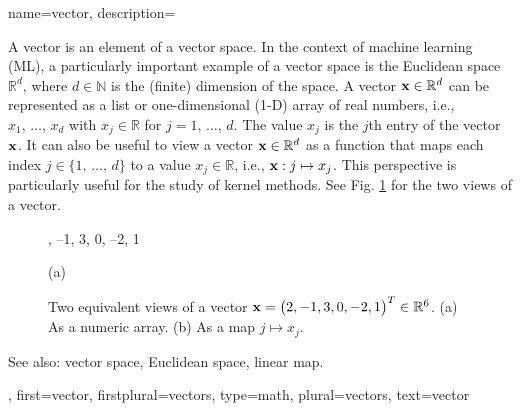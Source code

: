 {name={vector},
	description={A vector is an element of a vector space. 
		In the context of machine learning (ML), a particularly important example of a vector space 
		is the Euclidean space $\mathbb{R}^{d}$, where $d \in \mathbb{N}$ 
		is the (finite) dimension of the space. A vector ${\bf x} \in \mathbb{R}^{d}$ 
		can be represented as a list or one-dimensional (1-D) array of real numbers, i.e., 
		$x_1, \,\ldots, \,x_{d}$ with $x_j \in \mathbb{R}$ for 
		$j = 1, \,\ldots, \,d$. The value $x_j$ is the $j$th 
		entry of the vector ${\bf x}$. It can also be useful to view a vector ${\bf x} \in \mathbb{R}^{d}$ 
		as a function that maps each index $j \in \{1, \,\ldots, \,d\}$ 
		to a value $x_j \in \mathbb{R}$, i.e., ${\bf x}: j \mapsto x_j$. 
		This perspective is particularly useful for the study of kernel methods. See Fig. 
		\ref{fig:vector-function-dual_dict} for the two views of a vector.
		\begin{figure}[H]
			
			\begin{minipage}[c]{0.48\textwidth}
				, --1, 3, 0, --2, 1
				\begin{minipage}{\textwidth}
				\vspace{5ex}
				\centering
				{\selectfont (a)}
				\end{minipage}
			\end{minipage}
			\hfill
			
			\begin{minipage}{0.48\textwidth}
			\centering
			\end{minipage}
			\caption{Two equivalent views of a vector ${\bf x}= \big( 2, -1, 3, 0, -2, 1 \big)^{T} \in \mathbb{R}^{6}$.
			(a) As a numeric array. (b) As a map $j \mapsto x_j$.}
			\label{fig:vector-function-dual_dict}
		\end{figure}
		See also: vector space, Euclidean space, linear map.},
	first={vector},
	firstplural={vectors},
	type=math,
	plural={vectors},
	text={vector}
}


